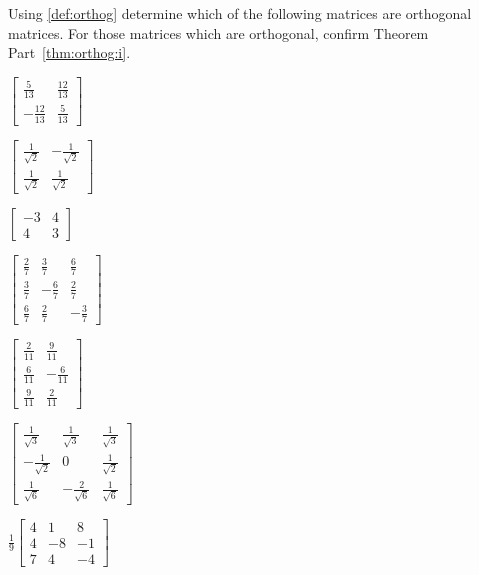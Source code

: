 \begin{exercise} \label{ex:} 
Using \autoref{def:orthog} determine which of the following matrices are orthogonal matrices.
For those matrices which are orthogonal, confirm Theorem Part~\ref{thm:orthog:i}.
\begin{parts}
\item \(\begin{bmatrix} \frac5{13}&\frac{12}{13}
\\-\frac{12}{13}&\frac5{13} \end{bmatrix}\)

\item \(\begin{bmatrix} \frac1{\sqrt2}&-\frac1{\sqrt2}
\\\frac1{\sqrt2}&\frac1{\sqrt2} \end{bmatrix}\)

\item \(\begin{bmatrix} -3&4
\\4&3 \end{bmatrix}\)

\item \(\begin{bmatrix} \frac27&\frac37&\frac67
\\\frac37&-\frac67&\frac27
\\\frac67&\frac27&-\frac37 \end{bmatrix}\)

\item \(\begin{bmatrix} \frac2{11}&\frac9{11}
\\\frac6{11}&-\frac6{11}
\\\frac9{11}&\frac2{11} \end{bmatrix}\)

\item \(\begin{bmatrix} \frac1{\sqrt3}&\frac1{\sqrt3}&\frac1{\sqrt3}
\\-\frac1{\sqrt2}&0&\frac1{\sqrt2}
\\\frac1{\sqrt6}&-\frac2{\sqrt6}&\frac1{\sqrt6} \end{bmatrix}\)

\item \(\frac19\begin{bmatrix} 4&1&8
\\4&-8&-1
\\7&4&-4 \end{bmatrix}\)


\end{parts}
\end{exercise}

